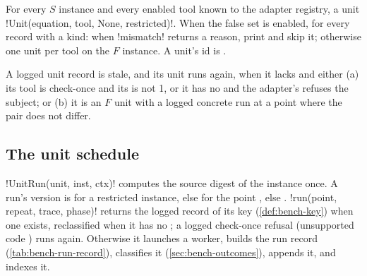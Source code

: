 \begin{algorithm}[Units]\label{alg:bench-units}
For every $S$ instance and every enabled tool known to the adapter registry, a unit
\py!Unit(equation, tool, None, restricted)!. When the false set is enabled, for every record with
a kind: when \py!mismatch! returns a reason, print 
and skip it; otherwise one unit per tool on the $F$ instance. A unit's id is
.
\end{algorithm}

\begin{algorithm}\label{alg:bench-stale}
A logged unit record is stale, and its unit runs again, when it lacks 
and either (a) its tool is check-once and its  is not 1, or it has no
 and the adapter's  refuses the subject; or (b) it is
an $F$ unit with a logged concrete run at a point where the pair does not differ.
\end{algorithm}

\subsection{The unit schedule}

\py!UnitRun(unit, inst, ctx)! computes the source digest of the instance once. A run's version
is  for a restricted instance, else  for the point ,
else . \py!run(point, repeat, trace, phase)! returns the logged record of its key
(\cref{def:bench-key}) when one exists, reclassified when it has no ; a logged
check-once refusal (unsupported code ) runs again. Otherwise it launches a
worker, builds the run record (\cref{tab:bench-run-record}), classifies it
(\cref{sec:bench-outcomes}), appends it, and indexes it.

